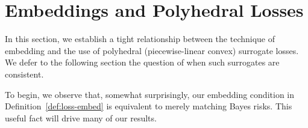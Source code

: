 \documentclass[12pt]{article}
\newcommand{\Comments}{1}
\newcommand{\mynote}[2]{\ifnum\Comments=1\textcolor{#1}{#2}\fi}
\newcommand{\raf}[1]{\mynote{green}{[RF: #1]}}
\newcommand{\simplex}{\Delta_\Y}
\newcommand{\Y}{\mathcal{Y}}
\newcommand{\risk}[1]{\underline{#1}}
\newcommand{\hinge}{L_{\mathrm{hinge}}}
\newcommand{\ellzo}{\ell_{\text{0-1}}}
\DeclareMathOperator*{\argmax}{arg\,max}
\begin{document}










\section{Embeddings and Polyhedral Losses}
\label{sec:poly-loss-embed}

In this section, we establish a tight relationship between the technique of embedding and the use of polyhedral (piecewise-linear convex) surrogate losses.
We defer to the following section the question of when such surrogates are consistent.

To begin, we observe that, somewhat surprisingly, our embedding condition in Definition~\ref{def:loss-embed} is equivalent to merely matching Bayes risks.
This useful fact will drive many of our results.
\end{document}
